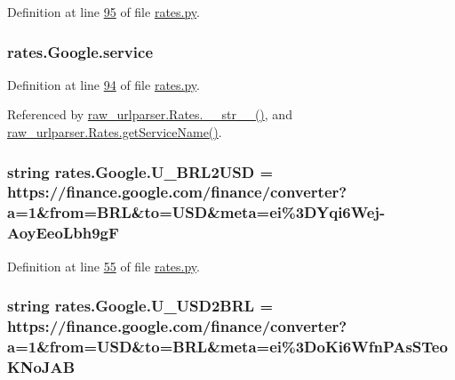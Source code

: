 Definition at line \hyperlink{rates_8py_source_l00095}{95} of file \hyperlink{rates_8py_source}{rates.\+py}.

\subsubsection[{\texorpdfstring{service}{service}}]{\setlength{\rightskip}{0pt plus 5cm}rates.\+Google.\+service}\hypertarget{classrates_1_1_google_a1da08e36d5007aa5293d048b625a35e9}{}\label{classrates_1_1_google_a1da08e36d5007aa5293d048b625a35e9}


Definition at line \hyperlink{rates_8py_source_l00094}{94} of file \hyperlink{rates_8py_source}{rates.\+py}.



Referenced by \hyperlink{raw__urlparser_8py_source_l00038}{raw\+\_\+urlparser.\+Rates.\+\_\+\+\_\+str\+\_\+\+\_\+()}, and \hyperlink{raw__urlparser_8py_source_l00035}{raw\+\_\+urlparser.\+Rates.\+get\+Service\+Name()}.

\subsubsection[{\texorpdfstring{U\+\_\+\+B\+R\+L2\+U\+SD}{U_BRL2USD}}]{\setlength{\rightskip}{0pt plus 5cm}string rates.\+Google.\+U\+\_\+\+B\+R\+L2\+U\+SD = \textquotesingle{}https\+://finance.\+google.\+com/finance/converter?a=1\&from=B\+RL\&to=U\+SD\&meta=ei\%3\+D\+Yqi6\+Wej-\/\+Aoy\+Eeo\+Lbh9g\+F\textquotesingle{}\hspace{0.3cm}{\ttfamily [static]}}\hypertarget{classrates_1_1_google_a46dbc3fa0a110bf5b66808c29642cfa1}{}\label{classrates_1_1_google_a46dbc3fa0a110bf5b66808c29642cfa1}


Definition at line \hyperlink{rates_8py_source_l00055}{55} of file \hyperlink{rates_8py_source}{rates.\+py}.

\subsubsection[{\texorpdfstring{U\+\_\+\+U\+S\+D2\+B\+RL}{U_USD2BRL}}]{\setlength{\rightskip}{0pt plus 5cm}string rates.\+Google.\+U\+\_\+\+U\+S\+D2\+B\+RL = \textquotesingle{}https\+://finance.\+google.\+com/finance/converter?a=1\&from=U\+SD\&to=B\+RL\&meta=ei\%3\+Do\+Ki6\+Wfn\+P\+As\+S\+Teo\+K\+No\+J\+A\+B\textquotesingle{}\hspace{0.3cm}{\ttfamily [static]}}\hypertarget{classrates_1_1_google_a77ef7f5932c48b002697fb187a234d4a}{}\label{classrates_1_1_google_a77ef7f5932c48b002697fb187a234d4a}


